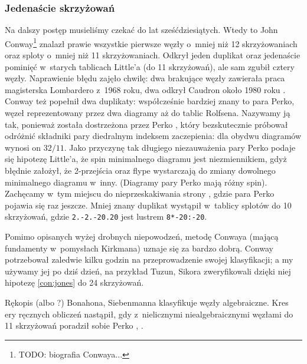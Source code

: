 
\subsubsection{Jedenaście skrzyżowań}
Na dalszy postęp musieliśmy czekać do lat sześćdziesiątych.
Wtedy to John Conway\footnote{TODO: biografia Conwaya...} \cite{conway1970} znalazł prawie wszystkie pierwsze węzły o~mniej niż 12 skrzyżowaniach oraz sploty o~mniej niż 11 skrzyżowaniach.
%
Odkrył jeden duplikat oraz jedenaście pominięć w~starych tablicach Little'a (do 11 skrzyżowań), ale sam zgubił cztery węzły.
Naprawienie błędu zajęło chwilę: dwa brakujące węzły zawierała praca magisterska Lombardero z~1968 roku, dwa odkrył Caudron około 1980 roku \cite{caudron1982}.
%
%
Conway też popełnił dwa duplikaty: współcześnie bardziej znany to para Perko, węzeł reprezentowany przez dwa diagramy aż do tablic Rolfsena.
%
Nazywamy ją tak, ponieważ została dostrzeżona przez Perko \cite{perko1974}, który bezskutecznie próbował odróżnić składniki pary diedralnym indeksem zaczepienia: dla obydwu diagramów wynosi on $32/11$.
%
Jako przyczynę tak długiego niezauważenia pary Perko podaje się hipotezę Little'a, że spin minimalnego diagramu jest niezmiennikiem, gdyż błędnie założył, że 2-przejścia oraz flype wystarczają do zmiany dowolnego minimalnego diagramu w~inny.
%
%
(Diagramy pary Perko mają różny spin).
Zachęcamy w~tym miejscu do nieprzeskakiwania strony \pageref{rolfsens_mistake}, gdzie para Perko pojawia się raz jeszcze.
Mniej znany duplikat wystąpił w~tablicy splotów do 10 skrzyżowań, gdzie \texttt{2.-2.-20.20} jest lustrem \texttt{8*-20:-20}.

Pomimo opisanych wyżej drobnych niepowodzeń, metodę Conwaya (mającą fundamenty w~pomysłach Kirkmana) uznaje się za bardzo dobrą.
Conway potrzebował zaledwie kilku godzin na przeprowadzenie swojej klasyfikacji; a my używamy jej po dziś dzień, na przykład Tuzun, Sikora zweryfikowali dzięki niej hipotezę \ref{con:jones} do 24 skrzyżowań.
%
%

Rękopis \cite{siebenmann1979} (albo \cite{bonahon1989}?) Bonahona, Siebenmanna klasyfikuje węzły algebraiczne.
%
%
Kres ery ręcznych obliczeń nastąpił, gdy z~nielicznymi niealgebraicznymi węzłami do 11 skrzyżowań poradził sobie Perko \cite{perko1980}, \cite{perko1982}.
%


